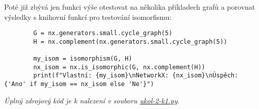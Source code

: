 \documentclass[10pt, a4paper]{ReportSheet}
\begin{document}
    Poté již zbývá jen funkci výše otestovat na několika příkladech grafů a porovnat výsledky s knihovní funkcí pro
    testování isomorfismu:
    \begin{verbatim}
        G = nx.generators.small.cycle_graph(5)
        H = nx.complement(nx.generators.small.cycle_graph(5))

        my_isom = isomorphism(G, H)
        nx_isom = nx.is_isomorphic(G, nx.complement(H))
        print(f"Vlastní: {my_isom}\nNetworkX: {nx_isom}\nÚspěch: {'Ano' if my_isom == nx_isom else 'Ne'}")
    \end{verbatim}

    \textit{
        Úplný zdrojový kód je k nalezení v souboru \href{https://github.com/filipditrich/MMAD-2024/blob/main/ukol-2-k1.py}{ukol-2-k1.py}.
    }
    \newpage

    \newpage
\end{document}
